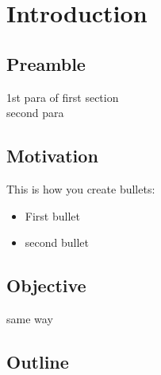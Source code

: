 \chapter{Introduction} \label{Introduction}
\section{Preamble} \label{Preamble}
\noindent1st para of first section\\
\noindent second para\\
\section{Motivation}\label{Motivation}
\noindent This is how you create bullets:\\
\vspace{-1cm}
\begin{itemize}
\item First bullet
\item second bullet
\end{itemize}
\section{Objective} \label{Objective}
\noindent same way
\section{Outline} \label{Outline}
